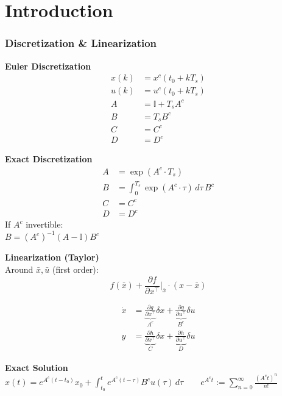 \section{Introduction}
\subsubsection{Discretization \& Linearization}
{\small
\noindent
\begin{minipage}[t]{0.32\linewidth}

\textbf{Euler Discretization}\\
\begin{align*}
x(k) &= x^c(t_0 + kT_s)\\
u(k) &= u^c(t_0 + kT_s)\\
A &= \mathbb{I} + T_sA^c\\
B &= T_s B^c\\
C &= C^c\\
D &= D^c
\end{align*}
\end{minipage}%
\hfill
\begin{minipage}[t]{0.32\linewidth}

\textbf{Exact Discretization}\\
\begin{align*}
A &= \exp{(A^c \cdot T_s)}\\
B &= \int^{T_s}_0 \exp{(A^c \cdot \tau)}\, d\tau\, B^c\\
C &= C^c\\
D &= D^c
\end{align*}
If $A^c$ invertible:\\
$B = (A^c)^{-1}(A-\mathbb{I})B^c$
\end{minipage}%
\hfill
\begin{minipage}[t]{0.32\linewidth}
\textbf{Linearization (Taylor)}\\
Around $\bar{x},\bar{u}$ (first order):\\
\[
f(\bar{x}) + \frac{\partial f}{\partial x^\top}\Big|_{\bar{x}} \cdot (x-\bar{x})
\]

\vspace{-0.5em}
\begin{align*}
\dot{x} &= \underbrace{\tfrac{\partial g}{\partial x^\top}}_{A^c} \delta x + \underbrace{\tfrac{\partial g}{\partial u^\top}}_{B^c} \delta u\\[0.3em]
y &= \underbrace{\tfrac{\partial h}{\partial x^\top}}_{C} \delta x + \underbrace{\tfrac{\partial h}{\partial u^\top}}_{D} \delta u
\end{align*}
\end{minipage}

\vspace{0.3em}
\noindent\textbf{Exact Solution}\\
$x(t) = e^{A^c(t-t_0)}x_0 + \displaystyle\int_{t_0}^{t} e^{A^c(t-\tau)}B^c u(\tau)\,d\tau \qquad e^{A^ct} := \sum_{n=0}^{\infty}\frac{(A^ct)^n}{n!}$
}



